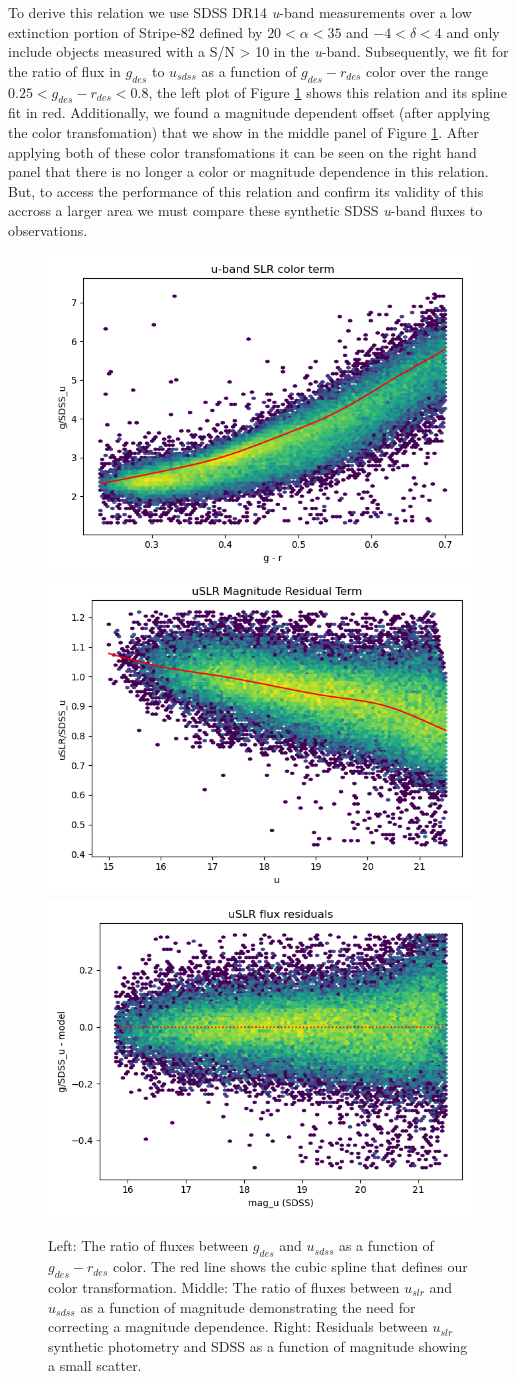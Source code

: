 To derive this relation we use SDSS DR14 \textit{u}-band measurements over a low extinction portion of Stripe-82 defined by $20 < \alpha < 35$ and $-4 < \delta < 4$ and only include objects measured with a S/N > 10 in the \textit{u}-band. 
Subsequently, we fit for the ratio of flux in $g_{des}$ to $u_{sdss}$ as a function of $g_{des}-r_{des}$ color over the range $0.25 <  g_{des}-r_{des} < 0.8$, the left plot of Figure \ref{fig:slr_spline} shows this relation and its spline fit in red. 
Additionally, we found a magnitude dependent offset (after applying the color transfomation) that we show in the middle panel of Figure \ref{fig:slr_spline}. 
After applying both of these color transfomations it can be seen on the right hand panel that there is no longer a color or magnitude dependence in this relation. 
But, to access the performance of this relation and confirm its validity of this accross a larger area we must compare these synthetic SDSS \textit{u}-band fluxes to observations.

\begin{figure}
    \includegraphics[width=0.32\linewidth]{./figures/u-band/uslr/transformed_to_SDSS_band_g_slr.png}
    \includegraphics[width=0.32\linewidth]{./figures/u-band/uslr/transformed_to_SDSS_band_g_slr_mag_offset.png}
    \includegraphics[width=0.32\linewidth]{./figures/u-band/uslr/transformed_to_SDSS_band_g_slr_flux_residuals.png}
    \label{fig:slr_spline}
    \caption{
    Left: The ratio of fluxes between $g_{des}$ and $u_{sdss}$ as a function of $g_{des}-r_{des}$ color. The red line shows the cubic spline that defines our color transformation.
    Middle: The ratio of fluxes between $u_{slr}$ and $u_{sdss}$ as a function of magnitude demonstrating the need for correcting a magnitude dependence. 
    Right: Residuals between $u_{slr}$ synthetic photometry and SDSS as a function of magnitude showing a small scatter.}
\end{figure}

